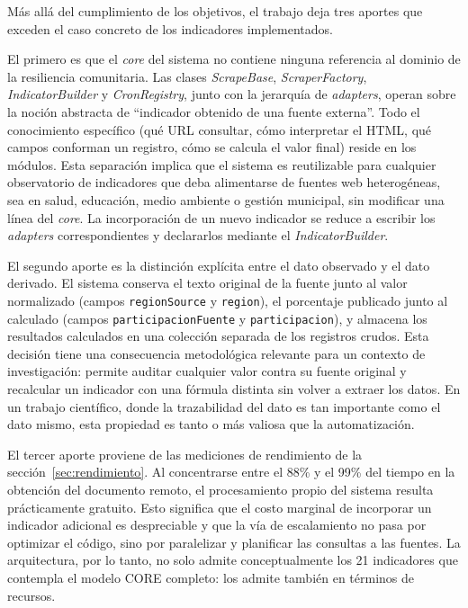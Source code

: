 \documentclass[12pt,letterpaper,oneside]{report}
\begin{document}
M\'as all\'a del cumplimiento de los objetivos, el trabajo deja tres aportes que exceden el caso concreto de los indicadores implementados.

El primero es que el \textit{core} del sistema no contiene ninguna referencia al dominio de la resiliencia comunitaria. Las clases \textit{ScrapeBase}, \textit{ScraperFactory}, \textit{IndicatorBuilder} y \textit{CronRegistry}, junto con la jerarqu\'ia de \textit{adapters}, operan sobre la noci\'on abstracta de ``indicador obtenido de una fuente externa''. Todo el conocimiento espec\'ifico (qu\'e URL consultar, c\'omo interpretar el HTML, qu\'e campos conforman un registro, c\'omo se calcula el valor final) reside en los m\'odulos. Esta separaci\'on implica que el sistema es reutilizable para cualquier observatorio de indicadores que deba alimentarse de fuentes web heterog\'eneas, sea en salud, educaci\'on, medio ambiente o gesti\'on municipal, sin modificar una l\'inea del \textit{core}. La incorporaci\'on de un nuevo indicador se reduce a escribir los \textit{adapters} correspondientes y declararlos mediante el \textit{IndicatorBuilder}.

El segundo aporte es la distinci\'on expl\'icita entre el dato observado y el dato derivado. El sistema conserva el texto original de la fuente junto al valor normalizado (campos \texttt{regionSource} y \texttt{region}), el porcentaje publicado junto al calculado (campos \texttt{participacionFuente} y \texttt{participacion}), y almacena los resultados calculados en una colecci\'on separada de los registros crudos. Esta decisi\'on tiene una consecuencia metodol\'ogica relevante para un contexto de investigaci\'on: permite auditar cualquier valor contra su fuente original y recalcular un indicador con una f\'ormula distinta sin volver a extraer los datos. En un trabajo cient\'ifico, donde la trazabilidad del dato es tan importante como el dato mismo, esta propiedad es tanto o m\'as valiosa que la automatizaci\'on.

El tercer aporte proviene de las mediciones de rendimiento de la secci\'on~\ref{sec:rendimiento}. Al concentrarse entre el 88\% y el 99\% del tiempo en la obtenci\'on del documento remoto, el procesamiento propio del sistema resulta pr\'acticamente gratuito. Esto significa que el costo marginal de incorporar un indicador adicional es despreciable y que la v\'ia de escalamiento no pasa por optimizar el c\'odigo, sino por paralelizar y planificar las consultas a las fuentes. La arquitectura, por lo tanto, no solo admite conceptualmente los 21 indicadores que contempla el modelo CORE completo: los admite tambi\'en en t\'erminos de recursos.
\end{document}
